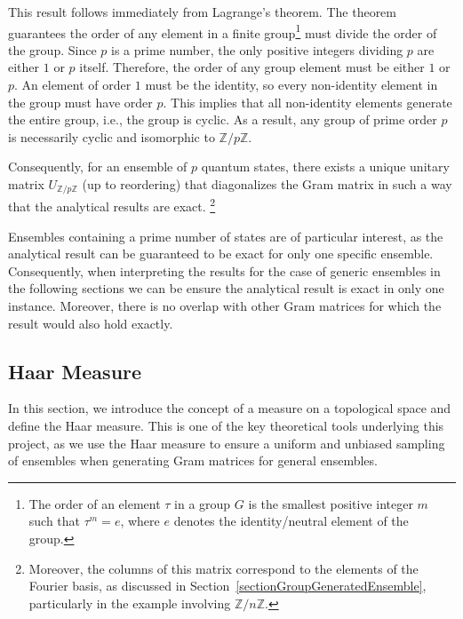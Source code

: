 \documentclass[12pt,letterpaper]{article}
\begin{document}
This result follows immediately from Lagrange's theorem. The theorem guarantees the order of any element in a finite group\footnote{The order of an element $\tau$ in a group $G$ is the smallest positive integer $m$ such that $\tau^m = e$, where $e$ denotes the identity/neutral element of the group.} must divide the order of the group. Since $p$ is a prime number, the only positive integers dividing $p$ are either $1$ or $p$ itself. Therefore, the order of any group element must be either $1$ or $p$. An element of order $1$ must be the identity, so every non-identity element in the group must have order $p$. This implies that all non-identity elements generate the entire group, i.e., the group is cyclic. As a result, any group of prime order $p$ is necessarily cyclic and isomorphic to $\mathbb{Z}/p\mathbb{Z}$.

Consequently, for an ensemble of $p$ quantum states, there exists a unique unitary matrix $U_{\mathbb{Z}/p\mathbb{Z}}$ (up to reordering) that diagonalizes the Gram matrix in such a way that the analytical results are exact. \footnote{Moreover, the columns of this matrix correspond to the elements of the Fourier basis, as discussed in Section~\ref{sectionGroupGeneratedEnsemble}, particularly in the example involving $\mathbb{Z}/n\mathbb{Z}$.}

Ensembles containing a prime number of states are of particular interest, as the analytical result can be guaranteed to be exact for only one specific ensemble. Consequently, when interpreting the results for the case of generic ensembles in the following sections we can be ensure the analytical result is exact in only one instance. Moreover, there is no overlap with other Gram matrices for which the result would also hold exactly.

\subsection{Haar Measure}
\hspace{20pt}In this section, we introduce the concept of a measure on a topological space and define the Haar measure. This is one of the key theoretical tools underlying this project, as we use the Haar measure to ensure a uniform and unbiased sampling of ensembles when generating Gram matrices for general ensembles.
\end{document}
